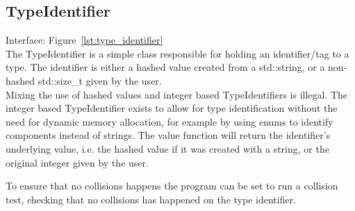\subsection{TypeIdentifier}
Interface: Figure~\ref{lst:type_identifier}\\\noindent
The TypeIdentifier is a simple class responsible for holding an identifier/tag to a type. 
The identifier is either a hashed value created from a std::string, or a non-hashed std::size\_t given by the user.\\
Mixing the use of hashed values and integer based TypeIdentifiers is illegal. 
The integer based TypeIdentifier exists to allow for type identification without the need for dynamic
memory allocation, for example by using enums to identify components instead of strings.
The value function will return the identifier's underlying value, i.e. the hashed value if it was created with a string, 
or the original integer given by the user.

To ensure that no collisions happens the program can be set to run a collision test,
checking that no collisions has happened on the type identifier.
